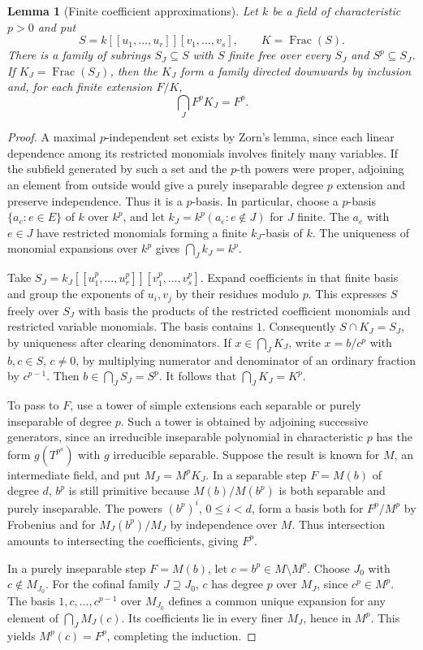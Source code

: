 \documentclass[11pt,oneside,openany]{book}
\newtheorem{lemma}[theorem]{Lemma}
\theoremstyle{definition}
\theoremstyle{remark}
\begin{document}
\begin{lemma}[Finite coefficient approximations]\label{res:X04}
Let \(k\) be a field of characteristic \(p>0\) and put
\[
 S=k[[u_1,\ldots,u_r]][v_1,\ldots,v_s],\qquad K=\operatorname{Frac}(S).
\]
There is a family of subrings \(S_J\subseteq S\) with \(S\) finite free over every \(S_J\) and \(S^p\subseteq S_J\). If \(K_J=\operatorname{Frac}(S_J)\), then the \(K_J\) form a family directed downwards by inclusion and, for each finite extension \(F/K\),
\[
                    \bigcap_J F^pK_J=F^p .
\]
\end{lemma}
\begin{proof}
A maximal \(p\)-independent set exists by Zorn's lemma, since each linear dependence among its restricted monomials involves finitely many variables. If the subfield generated by such a set and the \(p\)-th powers were proper, adjoining an element from outside would give a purely inseparable degree \(p\) extension and preserve independence. Thus it is a \(p\)-basis. In particular, choose a \(p\)-basis \(\{a_e:e\in E\}\) of \(k\) over \(k^p\), and let \(k_J=k^p(a_e:e\notin J)\) for \(J\) finite. The \(a_e\) with \(e\in J\) have restricted monomials forming a finite \(k_J\)-basis of \(k\). The uniqueness of monomial expansions over \(k^p\) gives \(\bigcap_J k_J=k^p\).

Take \(S_J=k_J[[u_1^p,\ldots,u_r^p]][v_1^p,\ldots,v_s^p]\). Expand coefficients in that finite basis and group the exponents of \(u_i,v_j\) by their residues modulo \(p\). This expresses \(S\) freely over \(S_J\) with basis the products of the restricted coefficient monomials and restricted variable monomials. The basis contains \(1\). Consequently \(S\cap K_J=S_J\), by uniqueness after clearing denominators. If \(x\in\bigcap_J K_J\), write \(x=b/c^p\) with \(b,c\in S\), \(c\ne0\), by multiplying numerator and denominator of an ordinary fraction by \(c^{p-1}\). Then \(b\in\bigcap_JS_J=S^p\). It follows that \(\bigcap_J K_J=K^p\).

To pass to \(F\), use a tower of simple extensions each separable or purely inseparable of degree \(p\). Such a tower is obtained by adjoining successive generators, since an irreducible inseparable polynomial in characteristic \(p\) has the form \(g(T^{p^a})\) with \(g\) irreducible separable. Suppose the result is known for \(M\), an intermediate field, and put \(M_J=M^p K_J\). In a separable step \(F=M(b)\) of degree \(d\), \(b^p\) is still primitive because \(M(b)/M(b^p)\) is both separable and purely inseparable. The powers \((b^p)^i\), \(0\le i<d\), form a basis both for \(F^p/M^p\) by Frobenius and for \(M_J(b^p)/M_J\) by independence over \(M\). Thus intersection amounts to intersecting the coefficients, giving \(F^p\).

In a purely inseparable step \(F=M(b)\), let \(c=b^p\in M\setminus M^p\). Choose \(J_0\) with \(c\notin M_{J_0}\). For the cofinal family \(J\supseteq J_0\), \(c\) has degree \(p\) over \(M_J\), since \(c^p\in M^p\). The basis \(1,c,\ldots,c^{p-1}\) over \(M_{J_0}\) defines a common unique expansion for any element of \(\bigcap_J M_J(c)\). Its coefficients lie in every finer \(M_J\), hence in \(M^p\). This yields \(M^p(c)=F^p\), completing the induction.
\end{proof}
\end{document}
